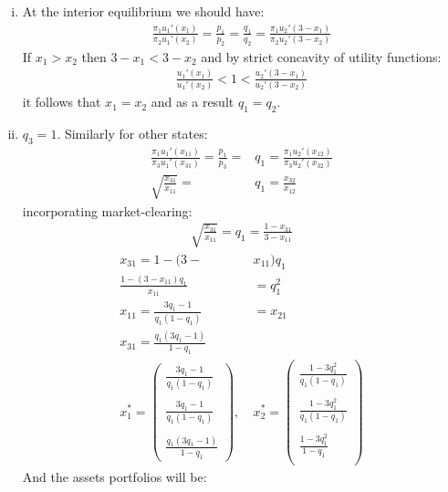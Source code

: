 \documentclass[a4paper]{article}
\begin{document}
\begin{enumerate}[(i)]
	\item At the interior equilibrium we should have:
	\begin{align*}
	\frac{\pi_1 u_1'(x_{1})}{\pi_2 u_1'(x_2)} = \frac{p_1}{p_2} = \frac{q_1}{q_2} = \frac{\pi_1u_2'(3 - x_1)}{\pi_2u_2'(3 - x_2)}
	\end{align*}
	If $x_1 > x_2$ then $3-x_1 < 3-x_2$ and by strict concavity of utility functions:
	\begin{align*}
	\frac{u_1'(x_1)}{u_1'(x_2)} < 1 < \frac{u_2'(3-x_1)}{u_2'(3-x_2)}
	\end{align*}
	it follows that $x_1 = x_2$ and as a result $q_1 = q_2$.
	\item $q_3 = 1$. Similarly for other states:
	\begin{align*}
	\frac{\pi_1 u_1'(x_{11})}{\pi_3 u_1'(x_{31})} = \frac{p_1}{p_3} = &q_1 = \frac{\pi_1u_2'(x_{12})}{\pi_3u_2'(x_{32})}\\
	\sqrt{\frac{x_{31}}{x_{11}}} = &q_1 = \frac{x_{32}}{x_{12}}
	\end{align*}
	incorporating market-clearing:
	\begin{align*}
	\sqrt{\frac{x_{31}}{x_{11}}} = q_1 = \frac{1- x_{31}}{3 - x_{11}}
	\end{align*}
	\begin{align*}
	x_{31} = 1 - (3-&x_{11})q_1\\
	\frac{1 - (3-x_{11})q_1}{x_{11}} &= q_1^2\\
	x_{11} = \frac{3q_1 - 1}{q_1(1 - q_1)} &= x_{21}\\
	x_{31} = \frac{q_1(3q_1 - 1)}{1 - q_1}\\
	x_1^* = \begin{pmatrix}
	\frac{3q_1 - 1}{q_1(1 - q_1)}\\
		\\
		\frac{3q_1 - 1}{q_1(1 - q_1)}\\
			\\
		\frac{q_1(3q_1 - 1)}{1 - q_1}	
	\end{pmatrix},\ &x_2^* = \begin{pmatrix}
	\frac{1 - 3q_1^2}{q_1(1 - q_1)}\\
	\\
	\frac{1 - 3q_1^2}{q_1(1 - q_1)}\\
	\\
	\frac{1 - 3q_1^2}{1 - q_1}\\
	\end{pmatrix}
	\end{align*}
	And the assets portfolios will be:

\end{enumerate}
\end{document}
